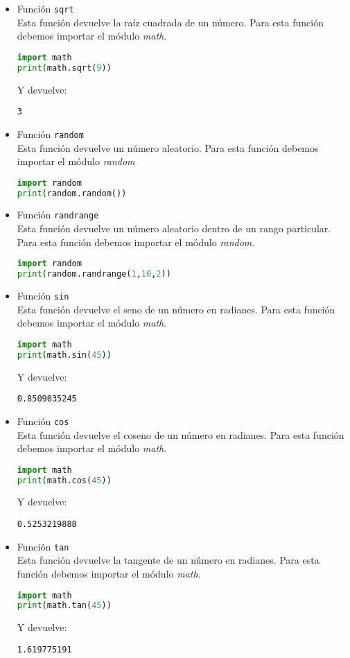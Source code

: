\begin{itemize}
		\item Función \texttt{sqrt}\\
		Esta función devuelve la raíz cuadrada de un número. Para esta función debemos importar el módulo \emph{math}.
		\begin{lstlisting}[language={python}]
import math
print(math.sqrt(9))
		\end{lstlisting}
		Y devuelve:
		\begin{lstlisting}[language={[latex]tex}]
3
		\end{lstlisting}
		\item Función \texttt{random}\\
		Esta función devuelve un número aleatorio. Para esta función debemos importar el módulo \emph{random}
		\begin{lstlisting}[language={python}]
import random
print(random.random())
		\end{lstlisting}
		\item Función \texttt{randrange}\\
		Esta función devuelve un número aleatorio dentro de un rango particular. Para esta función debemos importar el módulo \emph{random}.
		\begin{lstlisting}[language={python}]
import random
print(random.randrange(1,10,2))
		\end{lstlisting}
		\item Función \texttt{sin}\\
		Esta función devuelve el seno de un número en radianes. Para esta función debemos importar el módulo \emph{math}.
		\begin{lstlisting}[language={python}]
import math
print(math.sin(45))
		\end{lstlisting}
		Y devuelve:
		\begin{lstlisting}[language={[latex]tex}]
0.8509035245
		\end{lstlisting}
		\item Función \texttt{cos}\\
		Esta función devuelve el coseno de un número en radianes. Para esta función debemos importar el módulo \emph{math}.
		\begin{lstlisting}[language={python}]
import math
print(math.cos(45))
		\end{lstlisting}
		Y devuelve:
		\begin{lstlisting}[language={[latex]tex}]
0.5253219888
		\end{lstlisting}
		\item Función \texttt{tan}\\
		Esta función devuelve la tangente de un número en radianes. Para esta función debemos importar el módulo \emph{math}.
		\begin{lstlisting}[language={python}]
import math
print(math.tan(45))
		\end{lstlisting}
		Y devuelve:
		\begin{lstlisting}[language={[latex]tex}]
1.619775191
		\end{lstlisting}
	\end{itemize}